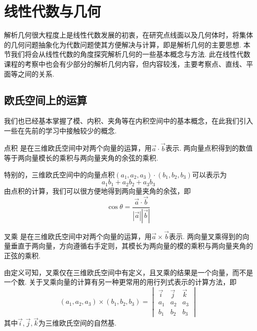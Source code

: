 \chapter{线性代数与几何} \label{chap:线性代数与几何}

解析几何很大程度上是线性代数发展的初衷，在研究点线面以及几何体时，将集体的几何问题抽象化为代数问题使其方便解决与计算，即是解析几何的主要思想. 本节我们将会从线性代数的角度探究解析几何的一些基本概念与方法. 此在线性代数课程的考察中也会有少部分的解析几何内容，但内容较浅，主要考察点、直线、平面等之间的关系.

\section{欧氏空间上的运算}

我们也已经基本掌握了模、内积、夹角等在内积空间中的基本概念，在此我们引入一些在先前的学习中接触较少的概念.
\begin{definition}{点积}{} 
    是在三维欧氏空间中对两个向量的运算，用$\vec{a}\cdot\vec{b}$表示. 两向量点积得到的数值等于两向量模长的乘积与两向量夹角的余弦的乘积.
\end{definition}
特别的，三维欧氏空间中的向量点积$(a_1,a_2,a_3)\cdot(b_1,b_2,b_3)$可以表示为\[a_1b_1+a_2b_2+a_3b_3\]
由点积的计算，我们可以很方便地得到两向量夹角的余弦，即\[\cos\theta=\frac{\vec{a}\cdot\vec{b}}{|\vec{a}||\vec{b}|}\]
\begin{definition}{叉乘}{} 
    是在三维欧氏空间中对两个向量的运算，用$\vec{a}\times\vec{b}$表示. 两向量叉乘得到的向量垂直于两向量，方向遵循右手定则，其模长为两向量的模的乘积与两向量夹角的正弦的乘积.
\end{definition}
由定义可知，叉乘仅在三维欧氏空间中有定义，且叉乘的结果是一个向量，而不是一个数. 关于叉乘向量的计算有另一种更常用的用行列式表示的计算方法，即
\[(a_1,a_2,a_3)\times(b_1,b_2,b_3)=\begin{vmatrix}
        \vec{i} & \vec{j} & \vec{k} \\
        a_1     & a_2     & a_3     \\
        b_1     & b_2     & b_3
    \end{vmatrix}\]
其中$\vec{i},\vec{j},\vec{k}$为三维欧氏空间的自然基.

